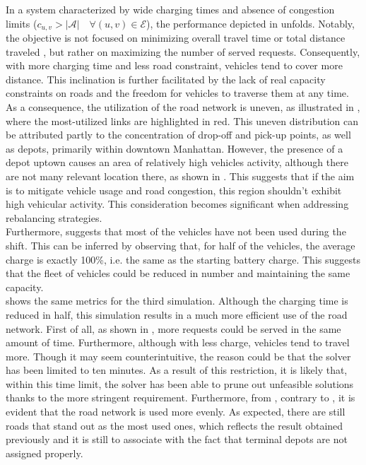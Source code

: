 In a system characterized by wide charging times and absence of congestion limits ($c_{u,v} > |\mathcal{A}| \quad \forall (u,v) \in \mathcal{E}$), the performance depicted in  unfolds. Notably, the objective is not focused on minimizing overall travel time  or total distance traveled , but rather on maximizing the number of served requests. Consequently, with more charging time and less road constraint, vehicles tend to cover more distance. This inclination is further facilitated by the lack of real capacity constraints on roads and the freedom for vehicles to traverse them at any time.\\
As a consequence, the utilization of the road network is uneven, as illustrated in , where the most-utilized links are highlighted in red. This uneven distribution can be attributed partly to the concentration of drop-off and pick-up points, as well as depots, primarily within downtown Manhattan. However, the presence of a depot uptown causes an area of relatively high vehicles activity, although there are not many relevant location there, as shown in . This suggests that if the aim is to mitigate vehicle usage and road congestion, this region shouldn't exhibit high vehicular activity. This consideration becomes significant when addressing rebalancing strategies.  \\
Furthermore,  suggests that most of the vehicles have not been used during the shift. This can be inferred by observing that, for half of the vehicles, the average charge is exactly 100\%, i.e. the same as the starting battery charge. This suggests that the fleet of vehicles could  be reduced in number and maintaining the same capacity. \\
 shows the same metrics for the third simulation. Although the charging time is reduced in half, this simulation results in a much more efficient use of the road network. First of all, as shown in , more requests could be served in the same amount of time. Furthermore, although with less charge, vehicles tend to travel more. Though it may seem counterintuitive, the reason could be that the solver has been limited to ten minutes. As a result of this restriction, it is likely that, within this time limit, the solver has been able to prune out unfeasible solutions thanks to the more stringent requirement. Furthermore, from , contrary to , it is evident that the road network is used more evenly. As expected, there are still roads that stand out as the most used ones, which reflects the result obtained previously and it is still to associate with the fact that terminal depots are not assigned properly. 
